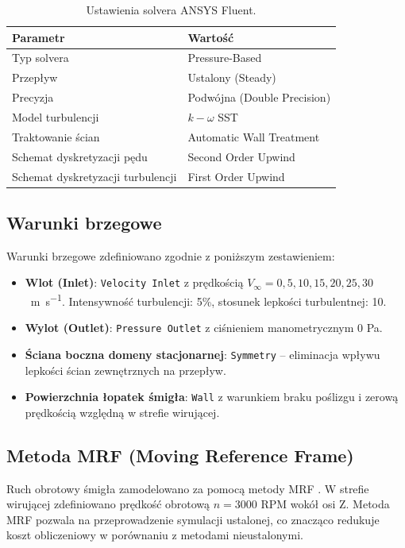 \documentclass[12pt,a4paper,twoside]{article}
\begin{document}
	\begin{table}[H]
		\centering
		\caption{Ustawienia solvera ANSYS Fluent.}
		\label{tab:solver_setup_cfd}
		\begin{tabular}{@{}l l@{}}
			\toprule
			\textbf{Parametr} & \textbf{Wartość} \\
			\midrule
			Typ solvera & Pressure-Based \\
			Przepływ & Ustalony (Steady) \\
			Precyzja & Podwójna (Double Precision) \\
			Model turbulencji & \(k-\omega\) SST \\
			Traktowanie ścian & Automatic Wall Treatment \\
			Schemat dyskretyzacji pędu & Second Order Upwind \\
			Schemat dyskretyzacji turbulencji & First Order Upwind \\
			\bottomrule
		\end{tabular}
	\end{table}
	
	\subsection{Warunki brzegowe}
	Warunki brzegowe zdefiniowano zgodnie z poniższym zestawieniem:
	\begin{itemize}
		\item \textbf{Wlot (Inlet)}: \texttt{Velocity Inlet} z prędkością \(V_\infty = 0, 5, 10, 15, 20, 25, 30\)~\si{\meter\per\second}. Intensywność turbulencji: 5\%, stosunek lepkości turbulentnej: 10.
		\item \textbf{Wylot (Outlet)}: \texttt{Pressure Outlet} z ciśnieniem manometrycznym 0 Pa.
		\item \textbf{Ściana boczna domeny stacjonarnej}: \texttt{Symmetry} -- eliminacja wpływu lepkości ścian zewnętrznych na przepływ.
		\item \textbf{Powierzchnia łopatek śmigła}: \texttt{Wall} z warunkiem braku poślizgu i zerową prędkością względną w strefie wirującej.
		
	\end{itemize}
	
	\subsection{Metoda MRF (Moving Reference Frame)}
	Ruch obrotowy śmigła zamodelowano za pomocą metody MRF \cite{mrf_method}. W strefie wirującej zdefiniowano prędkość obrotową \(n = 3000\) RPM wokół osi Z. Metoda MRF pozwala na przeprowadzenie symulacji ustalonej, co znacząco redukuje koszt obliczeniowy w porównaniu z metodami nieustalonymi.
	
\end{document}
